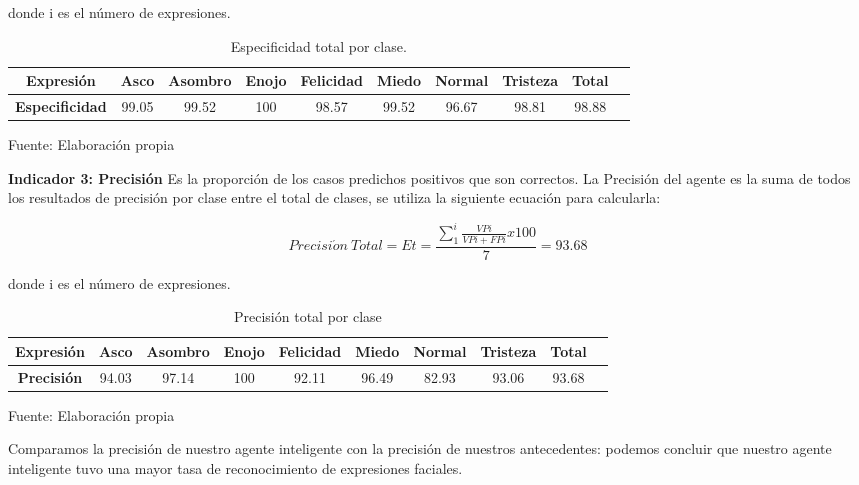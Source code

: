 donde i es el número de expresiones. 

\begin{table}[ht!]
\centering
\caption{Especificidad total por clase.} \vskip 0.1cm
\begin{tabular}{|c|c|c|c|c|c|c|c|c|c|} \hline
\bf Expresión & \bf Asco & \bf Asombro & \bf Enojo & \bf Felicidad & \bf Miedo & \bf Normal & \bf Tristeza & \bf Total \\ \hline
\bf Especificidad & 99.05 & 99.52 & 100 & 98.57 & 99.52 & 96.67 & 98.81 & 98.88 \\ \hline

\end{tabular}
\begin{center}
{\small{Fuente: Elaboración propia}}
\end{center}
\end{table}

\vskip 1cm

{\bf Indicador 3: Precisión} \vskip 0.1cm
Es la proporción de los casos predichos positivos que son correctos. La Precisión del agente es la suma de todos los resultados de precisión por clase entre el total de clases, se utiliza la siguiente ecuación para calcularla:

\begin{equation}
Precisi\acute{o}n~Total=Et=\frac{\sum_{1}^{i}\frac{VPi}{VPi+FPi}x100}{7}=93.68
\end{equation}

donde i es el número de expresiones. 

\begin{table}[ht!]
\centering
\caption{Precisión total por clase} \vskip 0.1cm
\begin{tabular}{|c|c|c|c|c|c|c|c|c|c|} \hline
\bf Expresión & \bf Asco & \bf Asombro & \bf Enojo & \bf Felicidad & \bf Miedo & \bf Normal & \bf Tristeza & \bf Total \\ \hline
\bf Precisión & 94.03 & 97.14 & 100 & 92.11 & 96.49 & 82.93 & 93.06 & 93.68 \\ \hline

\end{tabular}
\begin{center}
{\small{Fuente: Elaboración propia}}
\end{center}
\end{table}

Comparamos la precisión de nuestro agente inteligente con la precisión de nuestros antecedentes: podemos concluir que nuestro agente inteligente tuvo una mayor tasa de reconocimiento de expresiones faciales. 

